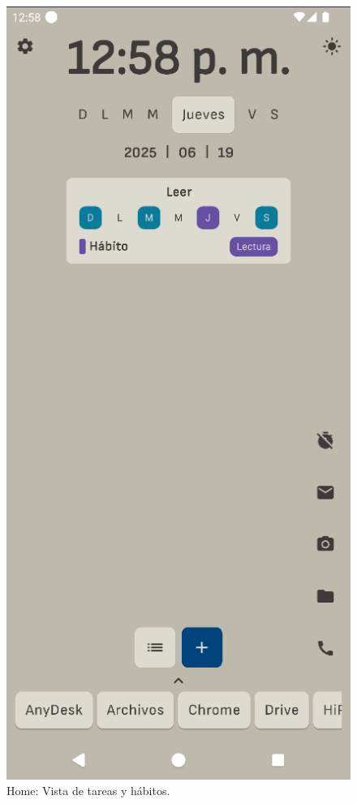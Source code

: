 \begin{figure}[ht]
  \centering
  \captionsetup{justification=centering}
  \begin{minipage}{0.43\textwidth}
    \caption{Home: Vista de tareas y hábitos.}
    \label{fig:home:vista_tareas_habitos}
    \centering
    \includegraphics[width=\textwidth]{Figuras/secciones/home_1.png}

\end{minipage}
\end{figure}
